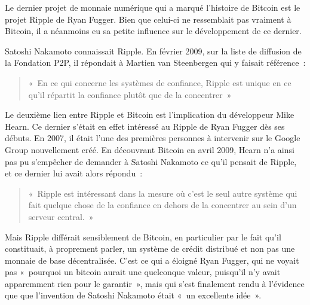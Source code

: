 Le dernier projet de monnaie numérique qui a marqué l'histoire de Bitcoin est le projet Ripple de Ryan Fugger. Bien que celui-ci ne ressemblait pas vraiment à Bitcoin, il a néanmoins eu sa petite influence sur le développement de ce dernier.

Satoshi Nakamoto connaissait Ripple. En février 2009, sur la liste de diffusion de la Fondation P2P, il répondait à Martien van Steenbergen qui y faisait référence~:

\begin{quote}
«~En ce qui concerne les systèmes de confiance, Ripple est unique en ce qu'il répartit la confiance plutôt que de la concentrer~»
\end{quote}

Le deuxième lien entre Ripple et Bitcoin est l'implication du développeur Mike Hearn. Ce dernier s'était en effet intéressé au Ripple de Ryan Fugger dès ses débuts. En 2007, il était l'une des premières personnes à intervenir sur le Google Group nouvellement créé. En découvrant Bitcoin en avril 2009, Hearn n'a ainsi pas pu s'empêcher de demander à Satoshi Nakamoto ce qu'il pensait de Ripple, et ce dernier lui avait alors répondu~:

\begin{quote}
«~Ripple est intéressant dans la mesure où c'est le seul autre système qui fait quelque chose de la confiance en dehors de la concentrer au sein d'un serveur central.~»
\end{quote}

Mais Ripple différait sensiblement de Bitcoin, en particulier par le fait qu'il constituait, à proprement parler, un système de crédit distribué et non pas une monnaie de base décentralisée. C'est ce qui a éloigné Ryan Fugger, qui ne voyait pas «~pourquoi un bitcoin aurait une quelconque valeur, puisqu'il n'y avait apparemment rien pour le garantir~», mais qui s'est finalement rendu à l'évidence que que l'invention de Satoshi Nakamoto était «~un excellente idée~».

